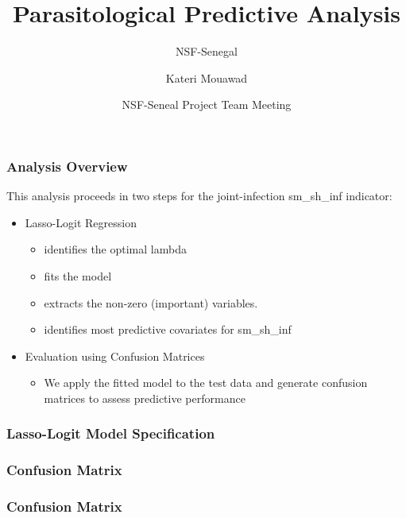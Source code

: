 \documentclass{beamer}
\title[Predictive Analysis] %
{Parasitological Predictive Analysis}
\subtitle{NSF-Senegal}
\author{Kateri Mouawad} %
\date[June 2025] %
{NSF-Seneal Project Team Meeting}
\begin{document}
\frame{\titlepage}

\begin{frame}
\frametitle{Analysis Overview}
This analysis proceeds in two steps for the joint-infection sm\_sh\_inf indicator:

\begin{itemize}
    \item<1-> Lasso-Logit Regression
       \begin{itemize}
             \item<2-> identifies the optimal lambda
             \item<3-> fits the model
             \item<4-> extracts the non-zero (important) variables.
             \item<5-> identifies most predictive covariates for sm\_sh\_inf
        \end{itemize}
    \item<3-> Evaluation using Confusion Matrices
         \begin{itemize}
                 \item<4-> We apply the fitted model to the test data and generate confusion matrices to assess predictive performance
         \end{itemize}
\end{itemize}

\end{frame}


\begin{frame}
\frametitle{Lasso-Logit Model Specification}




\end{frame}

\begin{frame}
\frametitle{Confusion Matrix}





\end{frame}

\begin{frame}
\frametitle{Confusion Matrix}



\end{frame}
\end{document}
